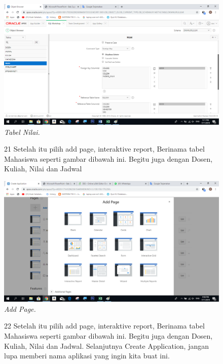 \begin{enumerate}
\begin{figure}
    \begin{center}
    \includegraphics[scale=0.6]{figures/22.png}
    \caption{\textit{Tabel Nilai.}}
    \end{center}
    \label{gambar}
    \end{figure}

\begin{figure}
\item[21] Setelah itu pilih add page, interaktive report, Berinama tabel Mahasiswa seperti gambar dibawah ini. Begitu juga dengan Dosen, Kuliah, Nilai dan Jadwal

    \begin{center}
    \includegraphics[scale=0.6]{figures/24.png}
    \caption{\textit{Add Page.}}
    \end{center}
    \label{gambar}
    \end{figure}    

\begin{figure}
\item[22] Setelah itu pilih add page, interaktive report, Berinama tabel Mahasiswa seperti gambar dibawah ini. Begitu juga dengan Dosen, Kuliah, Nilai dan Jadwal. Selanjutnya Create Application, jangan lupa memberi nama aplikasi yang ingin kita buat ini.


\end{figure}
\end{enumerate}
